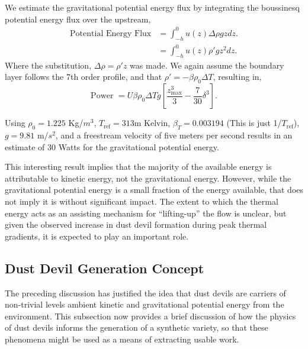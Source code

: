 We estimate the gravitational potential energy flux by integrating the
boussinesq potential energy flux over the upstream,  
\begin{align*}
  \text{Potential Energy Flux} & = \int_{-h}^0 u(z) \Delta \rho g z dz. \\
  & = \int_{-h}^0 u(z) \rho' g z^2 dz. 
\end{align*}
Where the substitution, $\Delta \rho = \rho' z$ was made. We again
assume the boundary layer follows the 7th order profile, and 
that $\rho' = -\beta \rho_0 \Delta T$, resulting in, 
%
%
\begin{equation}
 \text{Power } = U \beta \rho_0 \Delta T g \left[ \frac{z_\text{max}^3}{3} -
					    \frac{7}{30} \delta^3
					   \right]. 
\end{equation}

Using $\rho_0 = 1.225$ Kg/$m^3$, $T_{\text{ref}}=313$m Kelvin, $\beta_T
= 0.003194$ (This is just 1/$T_{\text{ref}}$), $g=9.81$ m/$s^2$, and a
freestream velocity of five meters per second results in an
estimate of 30 Watts for the gravitational potential energy. 

This interesting result implies that the majority of the available
energy is attributable to kinetic energy, not the gravitational
energy. 
However, while the
gravitational potential energy is a small fraction of the energy
available, that does not imply it is without significant impact. The
extent to which the thermal energy acts as an assisting mechanism for 
``lifting-up'' the flow is unclear, but given the observed increase in dust
devil formation during peak thermal gradients, it is expected
to play an important role. 

\subsection{Dust Devil Generation Concept}

The preceding discussion has justified the idea that 
dust devils are carriers of non-trivial levels ambient kinetic and
gravitational potential energy from the environment. This  
subsection now provides a brief discussion of how the physics of 
dust devils informs the generation of a synthetic variety, so that these
phenomena might be used as a means of extracting usable work. 

